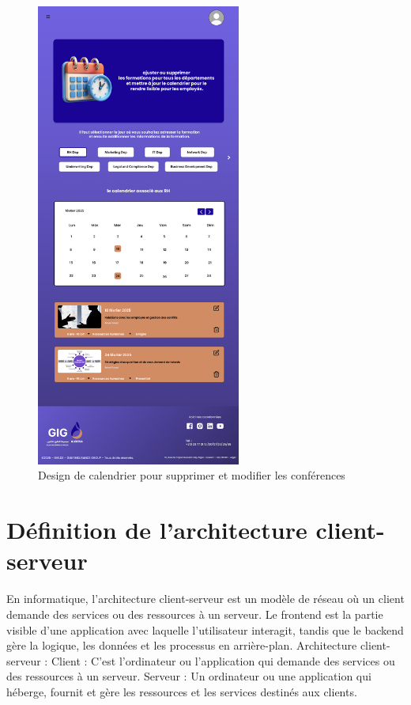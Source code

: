 \documentclass{article}
\begin{document}
  
\begin{figure}[H]
  \centering
  \includegraphics[width=0.6\textwidth]{Ajoute-formation.png}
  \caption{Design de calendrier pour supprimer et modifier les conférences}
  \end{figure}










\section{Définition de l'architecture client-serveur }
En informatique, l'architecture client-serveur est un modèle de réseau où un client demande des services ou des ressources à un serveur. Le frontend est la partie visible d'une application avec laquelle l'utilisateur interagit, tandis que le backend gère la logique, les données et les processus en arrière-plan. 
Architecture client-serveur :
Client :
C'est l'ordinateur ou l'application qui demande des services ou des ressources à un serveur. 
Serveur :
Un ordinateur ou une application qui héberge, fournit et gère les ressources et les services destinés aux clients. 
\label{annexe-client-ser}
\end{document}
